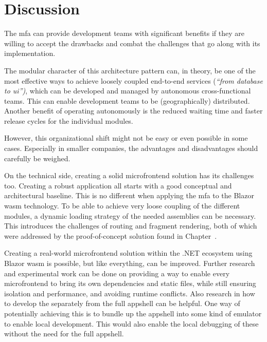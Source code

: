 
\chapter{Discussion}
\label{ch:discussion}


The \gls{mfa} can provide development teams with significant benefits if they
are willing to accept the drawbacks and combat the challenges that go along with
its implementation. 

The modular character of this architecture pattern can, in theory, be one of the
most effective ways to achieve loosely coupled end-to-end services
(\textit{``from database to \gls{ui}'')}, which can be developed and managed by
autonomous cross-functional teams. This can enable development teams to be
(geographically) distributed. Another benefit of operating autonomously is the
reduced waiting time and faster release cycles for the individual modules.

However, this organizational shift might not be easy or even possible in some
cases. Especially in smaller companies, the advantages and disadvantages should
carefully be weighed.

On the technical side, creating a solid \gls{microfrontend} solution has its
challenges too. Creating a robust application all starts with a good conceptual
and architectural baseline. This is no different when applying the \gls{mfa} to
the Blazor \gls{wasm} technology. To be able to achieve very loose coupling of
the different modules, a dynamic loading strategy of the needed assemblies can
be necessary. This introduces the challenges of routing and fragment rendering,
both of which were addressed by the proof-of-concept solution found in
Chapter~.

Creating a real-world \gls{microfrontend} solution within the .NET ecosystem
using Blazor \gls{wasm} is possible, but like everything, can be improved.
Further research and experimental work can be done on providing a way to enable
every \gls{microfrontend} to bring its own dependencies and static files, while
still ensuring isolation and performance, and avoiding runtime conflicts. Also
research in how to develop the  separately from the
full \gls{appshell} can be helpful. One way of potentially achieving this is to
bundle up the \gls{appshell} into some kind of emulator to enable local
development. This would also enable the local debugging of these
 without the need for the full \gls{appshell}.

